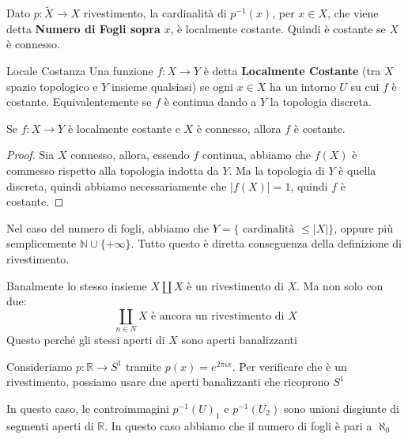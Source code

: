 \documentclass[11pt, a4paper, twoside]{article}
\begin{document}
\begin{oss}
	Dato $p:\tilde X \to X$ rivestimento, la cardinalità di $p^{-1}(x)$, per $x \in X$, che viene detta \textbf{Numero di Fogli sopra }$x$, è localmente costante. Quindi è costante se $X$ è connesso.
\end{oss}

\begin{defn}{Locale Costanza}{}
	Una funzione $f:X \to Y$ è detta \textbf{Localmente Costante} (tra $X$ spazio topologico e $Y$ insieme qualsiasi) se ogni $x \in X$ ha un intorno $U$ su cui $f$ è costante. Equivalentemente se $f$ è continua dando a $Y$ la topologia discreta.
\end{defn}

\begin{lemma}{}{}
	Se $f:X \to Y$ è localmente costante e $X$ è connesso, allora $f$ è costante.
\end{lemma}
\begin{proof}
	Sia $X$ connesso, allora, essendo $f$ continua, abbiamo che $f(X)$ è commesso rispetto alla topologia indotta da $Y$. Ma la topologia di $Y$ è quella discreta, quindi abbiamo necessariamente che $|f(X)| = 1$, quindi $f$ è costante.
\end{proof}

Nel caso del numero di fogli, abbiamo che $Y = \{\text{ cardinalità }\leq |X|\}$, oppure più semplicemente $\mathbb N \cup \{+\infty\}$. Tutto questo è diretta conseguenza della definizione di rivestimento.

\begin{es}
	Banalmente lo stesso insieme $X \amalg X$ è un rivestimento di $X$. Ma non solo con due:
	\[ \coprod_{n \in N}X \text{ è ancora un rivestimento di }X \]
	Questo perché gli stessi aperti di $X$ sono aperti banalizzanti
\end{es}

\begin{es}
	Consideriamo $p:\mathbb R \to S^1$ tramite $p(x) = e^{2 \pi ix}$. Per verificare che è un rivestimento, possiamo usare due aperti banalizzanti che ricoprono $S^1$
	\begin{center}
	\end{center}
	In questo caso, le controimmagini $p^{-1}(U)_1$ e $p^{-1}(U_2)$ sono unioni disgiunte di segmenti aperti di $\mathbb  R$. In questo caso abbiamo che il numero di fogli è pari a $\aleph_0$
\end{es}
\end{document}

